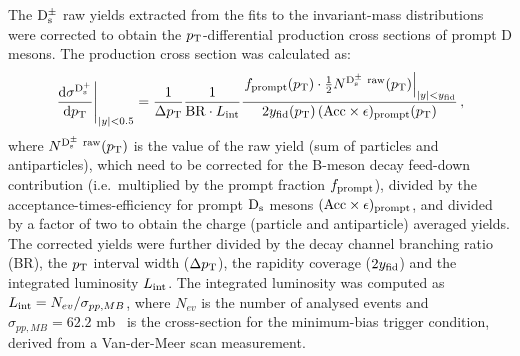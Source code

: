The ${\rm D_s^{\pm}}$ raw yields extracted from the fits to the invariant-mass distributions
were corrected to obtain the $p_{\rm T}$-differential production cross sections of prompt
 D mesons. The production cross section was calculated as:
\begin{equation}
  \label{eq:dsdpt}
  \left.\frac{{\rm d} \sigma^{\rm D^{+}_{\rm s}}}{{\rm d}p_{\rm T}}\right|_{|y|<0.5}=
  \frac{1}{ \Delta p_{\rm T}}\frac{1}{{\rm BR} \cdot L_{\rm int}}\frac{\left.f_{\rm prompt}(p_{\rm T})\cdot \frac{1}{2} N^{\rm D^\pm_{\rm s}~raw}(p_{\rm T})\right|_{|y|<y_{\rm fid}}}{ 2 y_{\rm fid}(p_{\rm T}) \,({\rm Acc}\times\epsilon)_{\rm prompt}(p_{\rm T})}\,,
\end{equation}
where $N^{\rm D^\pm_{\rm s}~raw}(p_{\rm T})$ is the value of the raw yield 
(sum of particles and antiparticles),
 which need to be corrected for the B-meson decay feed-down contribution 
(i.e.\ multiplied by the prompt fraction $f_{\rm{prompt}}$), divided by the 
acceptance-times-efficiency for prompt ${\rm D_s}$ mesons 
$(\rm Acc \times \epsilon)_{\rm{prompt}}$, and divided by a factor of two to 
obtain the charge (particle and antiparticle) averaged yields.
The corrected yields were further divided by the decay channel branching ratio (BR), 
the $p_{\rm T}$ interval width ($\Delta p_{\rm T}$), the rapidity coverage 
($2 y_{\rm fid}$) and the integrated luminosity $L_{\rm int}$.
The integrated luminosity was computed as $L_{\rm int} = N_{ev}/\sigma_{pp,MB}$,
where $N_{ev}$ is the number of analysed events and 
$\sigma_{pp,MB} = 62.2$ mb~\cite{Abelev:2012sea}
is the cross-section for the minimum-bias trigger condition, derived from
a Van-der-Meer scan measurement.

